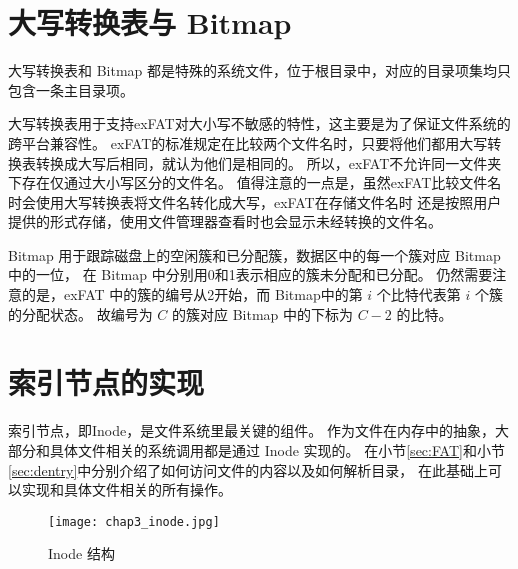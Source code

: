 \section{大写转换表与 Bitmap}
大写转换表和 Bitmap 都是特殊的系统文件，位于根目录中，对应的目录项集均只包含一条主目录项。

大写转换表用于支持exFAT对大小写不敏感的特性，这主要是为了保证文件系统的跨平台兼容性。
exFAT的标准规定在比较两个文件名时，只要将他们都用大写转换表转换成大写后相同，就认为他们是相同的。
所以，exFAT不允许同一文件夹下存在仅通过大小写区分的文件名。
值得注意的一点是，虽然exFAT比较文件名时会使用大写转换表将文件名转化成大写，exFAT在存储文件名时
还是按照用户提供的形式存储，使用文件管理器查看时也会显示未经转换的文件名。

Bitmap 用于跟踪磁盘上的空闲簇和已分配簇，数据区中的每一个簇对应 Bitmap 中的一位，
在 Bitmap 中分别用0和1表示相应的簇未分配和已分配。
仍然需要注意的是，exFAT 中的簇的编号从2开始，而 Bitmap中的第 $ i $ 个比特代表第 $ i $ 个簇的分配状态。
故编号为 $ C $ 的簇对应 Bitmap 中的下标为 $ C - 2 $ 的比特。

\section{索引节点的实现}
索引节点，即Inode，是文件系统里最关键的组件。
作为文件在内存中的抽象，大部分和具体文件相关的系统调用都是通过 Inode 实现的。
在小节\ref{sec:FAT}和小节\ref{sec:dentry}中分别介绍了如何访问文件的内容以及如何解析目录，
在此基础上可以实现和具体文件相关的所有操作。

\begin{figure}[h]
    \centering
    \texttt{[image: chap3\_inode.jpg]}
    \caption{Inode 结构}
    \label{fig:inode}
\end{figure}

